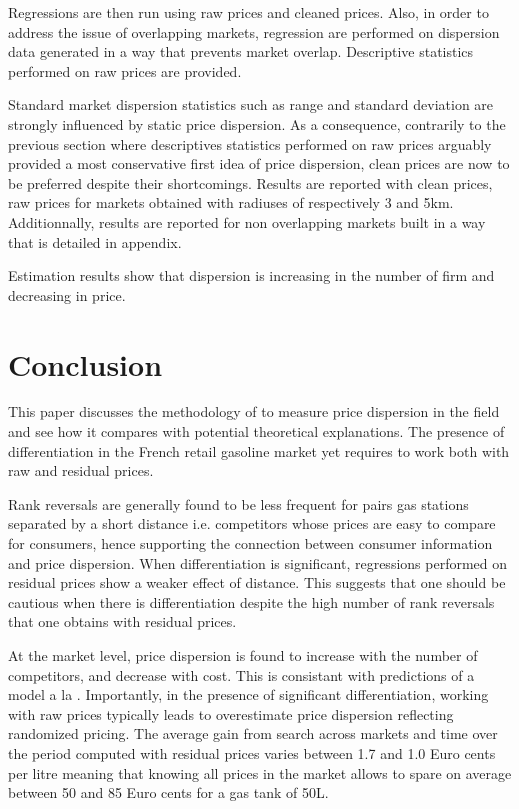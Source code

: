 \documentclass[english]{article}
\begin{document}
Regressions are then run using raw prices and cleaned prices. Also, in order to address the issue of overlapping markets, regression are performed on dispersion data generated in a way that prevents market overlap. Descriptive statistics performed on raw prices are provided.

Standard market dispersion statistics such as range and standard deviation are strongly influenced by static price dispersion. As a consequence, contrarily to the previous section where descriptives statistics performed on raw prices arguably provided a most conservative first idea of price dispersion, clean prices are now to be preferred despite their shortcomings. Results are reported with clean prices, raw prices for markets obtained with radiuses of respectively 3 and 5km. Additionnally, results are reported for non overlapping markets built in a way that is detailed in appendix.



Estimation results show that dispersion is increasing in the number of firm and decreasing in price.

\section{Conclusion}

This paper discusses the methodology of \cite{TAP11} to measure price dispersion in the field and see how it compares with potential theoretical explanations. The presence of differentiation in the French retail gasoline market yet requires to work both with raw and residual prices.

Rank reversals are generally found to be less frequent for pairs gas stations separated by a short distance i.e. competitors whose prices are easy to compare for consumers, hence supporting the connection between consumer information and price dispersion. When differentiation is significant, regressions performed on residual prices show a weaker effect of distance. This suggests that one should be cautious when there is differentiation despite the high number of rank reversals that one obtains with residual prices.

At the market level, price dispersion is found to increase with the number of competitors, and decrease with cost. This is consistant with predictions of a model a la \cite{VAR80}. Importantly, in the presence of significant differentiation, working with raw prices typically leads to overestimate price dispersion reflecting randomized pricing. The average gain from search across markets and time over the period computed with residual prices varies between 1.7 and 1.0 Euro cents per litre meaning that knowing all prices in the market allows to spare on average between 50 and 85 Euro cents for a gas tank of 50L.
\end{document}
